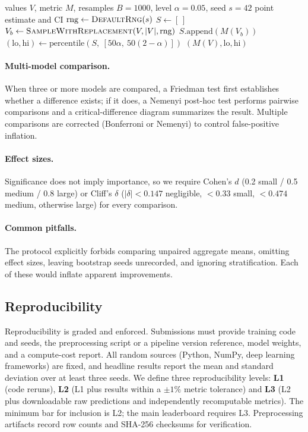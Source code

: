 \begin{algorithm}[t]
\caption{Bootstrap confidence interval for a metric.}
\label{alg:bootstrap}
\begin{algorithmic}[1]
\Require values $V$, metric $M$, resamples $B = 1000$, level $\alpha = 0.05$, seed $s = 42$
\Ensure point estimate and CI
\State $\mathrm{rng} \gets \textsc{DefaultRng}(s)$
\State $S \gets [\,]$
    \State $V_b \gets \textsc{SampleWithReplacement}(V, |V|, \mathrm{rng})$
    \State $S.\mathrm{append}(M(V_b))$
\EndFor
\State $(\text{lo}, \text{hi}) \gets \mathrm{percentile}(S,\ [50\alpha,\ 50(2-\alpha)])$
\State \Return $(M(V), \text{lo}, \text{hi})$
\end{algorithmic}
\end{algorithm}

\paragraph{Multi-model comparison.}
When three or more models are compared, a Friedman test first establishes
whether a difference exists; if it does, a Nemenyi post-hoc test performs
pairwise comparisons and a critical-difference diagram summarizes the result.
Multiple comparisons are corrected (Bonferroni or Nemenyi) to control
false-positive inflation.

\paragraph{Effect sizes.}
Significance does not imply importance, so we require Cohen's $d$ (0.2 small /
0.5 medium / 0.8 large) or Cliff's $\delta$ ($|\delta|<0.147$ negligible,
$<0.33$ small, $<0.474$ medium, otherwise large) for every comparison.

\paragraph{Common pitfalls.}
The protocol explicitly forbids comparing unpaired aggregate means, omitting
effect sizes, leaving bootstrap seeds unrecorded, and ignoring stratification.
Each of these would inflate apparent improvements.

\subsection{Reproducibility}
\label{sec:protocol-repro}

Reproducibility is graded and enforced. Submissions must provide training code
and seeds, the preprocessing script or a pipeline version reference, model
weights, and a compute-cost report. All random sources (Python, NumPy, deep
learning frameworks) are fixed, and headline results report the mean and
standard deviation over at least three seeds. We define three reproducibility
levels: \textbf{L1} (code reruns), \textbf{L2} (L1 plus results within a
$\pm 1\%$ metric tolerance) and \textbf{L3} (L2 plus downloadable raw
predictions and independently recomputable metrics). The minimum bar for
inclusion is L2; the main leaderboard requires L3. Preprocessing artifacts
record row counts and SHA-256 checksums for verification.

